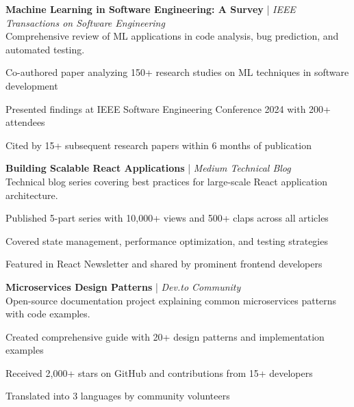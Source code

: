\noindent\textbf{Machine Learning in Software Engineering: A Survey} | \emph{IEEE Transactions on Software Engineering}\\
Comprehensive review of ML applications in code analysis, bug prediction, and automated testing.
\begin{tightitemize}
  \item Co-authored paper analyzing 150+ research studies on ML techniques in software development
  \item Presented findings at IEEE Software Engineering Conference 2024 with 200+ attendees
  \item Cited by 15+ subsequent research papers within 6 months of publication
\end{tightitemize}

\vspace{0.3em}
\noindent\textbf{Building Scalable React Applications} | \emph{Medium Technical Blog}\\
Technical blog series covering best practices for large-scale React application architecture.
\begin{tightitemize}
  \item Published 5-part series with 10,000+ views and 500+ claps across all articles
  \item Covered state management, performance optimization, and testing strategies
  \item Featured in React Newsletter and shared by prominent frontend developers
\end{tightitemize}

\vspace{0.3em}
\noindent\textbf{Microservices Design Patterns} | \emph{Dev.to Community}\\
Open-source documentation project explaining common microservices patterns with code examples.
\begin{tightitemize}
  \item Created comprehensive guide with 20+ design patterns and implementation examples
  \item Received 2,000+ stars on GitHub and contributions from 15+ developers
  \item Translated into 3 languages by community volunteers
\end{tightitemize}